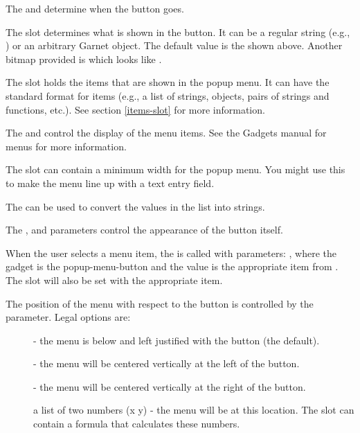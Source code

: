 The  and  determine when the button goes.

The  slot determines what is shown in the button.  It can
be a regular string (e.g., ) or an arbitrary Garnet
object.  The default value is the  shown above.
Another bitmap provided is  which looks like
.

The  slot holds the items that are shown in the popup menu.
It can have the standard format for items (e.g., a list of strings,
objects, pairs of strings and functions, etc.).  See section \ref{items-slot}
for more information.

The  and  control the display
of the menu items.  See the Gadgets manual for menus for more information.

The  slot can contain a minimum width for the popup menu.
You might use this to make the menu line up with a text entry field.

The  can be used to convert the values in
the  list into strings.

The ,  and 
parameters control the appearance of the button itself.

When the user selects a menu item, the  is
called with parameters:\newline{} , where the gadget is
the popup-menu-button and the value is the appropriate item from
.  The  slot will also be set with the
appropriate item.

The position of the menu with respect to the button is controlled by
the  parameter.  Legal options are:
\begin{description}
\item[]  - the menu is below and left justified with the button
(the default).

\item[]  - the menu will be centered vertically at the left of the button.

\item[]  - the menu will be centered vertically at the right of the button.

\item[] a list of two numbers (x y) - the menu will be at this location.  The
 slot can contain a formula that calculates these
numbers.
\end{description}

